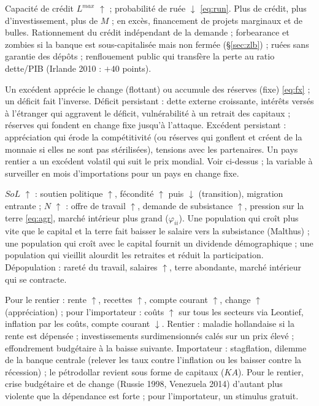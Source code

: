 \documentclass[11pt,a4paper]{article}
\newcommand{\up}{$\uparrow$}
\newcommand{\dn}{$\downarrow$}
\begin{document}
\direct Capacité de crédit $L^{max}$ \up{} ; probabilité de ruée \dn{} \eqref{eq:run}.
\second Plus de crédit, plus d'investissement, plus de $M$ ; en excès, financement de projets marginaux et de bulles.
\baisse Rationnement du crédit indépendant de la demande ; forbearance et zombies si la banque est sous-capitalisée mais non fermée (\S\ref{sec:zlb}) ; ruées sans garantie des dépôts ; renflouement public qui transfère la perte au ratio dette/PIB (Irlande 2010 : $+40$ points).

\direct Un excédent apprécie le change (flottant) ou accumule des réserves (fixe) \eqref{eq:fx} ; un déficit fait l'inverse.
\second Déficit persistant : dette externe croissante, intérêts versés à l'étranger qui aggravent le déficit, vulnérabilité à un retrait des capitaux ; réserves qui fondent en change fixe jusqu'à l'attaque. Excédent persistant : appréciation qui érode la compétitivité (ou réserves qui gonflent et créent de la monnaie si elles ne sont pas stérilisées), tensions avec les partenaires. Un pays rentier a un excédent volatil qui suit le prix mondial.
\baisse Voir ci-dessus ; la variable à surveiller en mois d'importations pour un pays en change fixe.

\direct $SoL$ \up{} : soutien politique \up, fécondité \up{} puis \dn{} (transition), migration entrante ; $N$ \up{} : offre de travail \up{}, demande de subsistance \up{}, pression sur la terre \eqref{eq:agr}, marché intérieur plus grand ($\varphi_{ii}$).
\second Une population qui croît plus vite que le capital et la terre fait baisser le salaire vers la subsistance (Malthus) ; une population qui croît avec le capital fournit un dividende démographique ; une population qui vieillit alourdit les retraites et réduit la participation.
\baisse Dépopulation : rareté du travail, salaires \up, terre abondante, marché intérieur qui se contracte.

\direct Pour le rentier : rente \up, recettes \up, compte courant \up, change \up{} (appréciation) ; pour l'importateur : coûts \up{} sur tous les secteurs via Leontief, inflation par les coûts, compte courant \dn.
\second Rentier : maladie hollandaise si la rente est dépensée ; investissements surdimensionnés calés sur un prix élevé ; effondrement budgétaire à la baisse suivante. Importateur : stagflation, dilemme de la banque centrale (relever les taux contre l'inflation ou les baisser contre la récession) ; le pétrodollar revient sous forme de capitaux ($KA$).
\baisse Pour le rentier, crise budgétaire et de change (Russie 1998, Venezuela 2014) d'autant plus violente que la dépendance est forte ; pour l'importateur, un stimulus gratuit.
\end{document}
